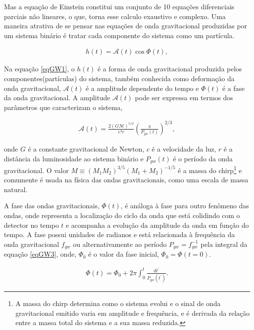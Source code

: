 Mas a equação de Einstein constitui um conjunto de 10 equações diferenciais parciais não lineares, o que, torna esse calculo exaustivo e complexo. Uma maneira atrativa de se pensar nas equações de onda gravitacional produzidas por um sistema binário é tratar cada componente do sistema como um partícula.

\begin{equation} \label{eqGW1}
\begin{split}
h(t) = \mathcal{A}(t)\cos \Phi(t),
\end{split}
\end{equation}

Na equação \ref{eqGW1}, o $h(t)$ é a forma de onda gravitacional produzida pelos componentes(partículas) do sistema, também conhecida como deformação da onda gravitacional, $\mathcal{A}(t)$ é a amplitude dependente do tempo e $\Phi (t)$ é a fase da onda gravitacional. A amplitude $\mathcal{A}(t)$ pode ser expressa em termos dos parâmetros que caracterizam o sistema,

\begin{equation} \label{eqGW2}
\begin{split}
\mathcal{A}(t) = \frac{2(G\mathcal{M})^{5/3}}{c^4 r} \left(\frac{\pi}{P_{gw}(t)}\right)^{2/3} ,
\end{split}
\end{equation}

onde $G$ é a constante gravitacional de Newton, $c$ é a velocidade da luz, $r$ é a distância da luminosidade ao sistema binário e $P_{gw}(t)$ é o período da onda gravitacional. O valor $M \equiv (M_1 M_2)^{3/5}(M_1+M_2)^{-1/5}$ é a massa do chirp\footnote{A massa do chirp determina como o sistema evolui e o sinal de onda gravitacional emitido varia em amplitude e frequência, e é derivada da relação entre a massa total do sistema e a sua massa reduzida.} e comumente é usada na física das ondas gravitacionais, como uma escala de massa natural.

A fase das ondas gravitacionais, $\Phi (t)$, é análoga à fase para outro fenômeno das ondas, onde representa a localização do ciclo da onda que está colidindo com o detector no tempo $t$ e acompanha a evolução da amplitude da onda em função do tempo. A fase possui unidades de radianos e está relacionada à frequência da onda gravitacional $f_{gw}$ ou alternativamente ao período $P_{gw} = {f_{gw}^{-1}}$ pela integral da equação \ref{eqGW3}, onde, $\Phi_0$ é o valor da fase inicial, $\Phi_0=\Phi(t=0)$.

\begin{equation} \label{eqGW3}
\begin{split}
\Phi(t) = \Phi_0 + 2\pi \int_0^t \! \frac{{dt}^{'}}{P_{gw}(t^{'})}.
\end{split}
\end{equation}

